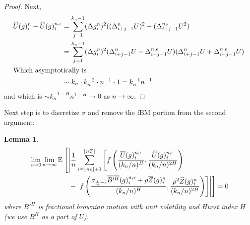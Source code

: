 \documentclass[12pt,letterpaper]{article}
\newtheorem{lemma}{Lemma}
\theoremstyle{definition}
\newcommand{\E}{\mathbb{E}}
\begin{document}
\begin{proof}
  Next,
  \begin{align}
    \widehat{U}(g)^{n}_i - \widehat{U}(g)^{n,\epsilon}_i &= \sum_{j=1}^{k_n-1}(\Delta g^n_i)^2((\Delta_{i+j-1}^{n}U)^2 - (\Delta_{i+j-1}^{n,\epsilon}U^2) \\
                                                         &= \sum_{j=1}^{k_n-1}(\Delta g^n_i)^2(\Delta_{i+j-1}^{n}U - \Delta_{i+j-1}^{n,\epsilon}U)(\Delta_{i+j-1}^{n}U + \Delta_{i+j-1}^{n,\epsilon}U) \\
    \intertext{Which asymptotically is}
                                                         &\sim k_n \cdot k_n^{-2} \cdot n^{-1} \cdot 1 = k_{n}^{-1}n^{-1}
  \end{align}
  and which is \(\sim k_{n}^{-1-H}n^{1-H} \rightarrow 0\) as \(n \rightarrow \infty\).
\end{proof}

Next step is to discretize \(\sigma\) and remove the fBM portion from the second argument:

\begin{lemma}
  \begin{align}
    \phantom{}
    \begin{aligned}
      &\lim_{\epsilon \rightarrow 0}\lim_{n \rightarrow \infty}\E \left[ \left| \frac{1}{n}\sum_{i=\left\lfloor n\epsilon \right\rfloor + 1}^{\left\lfloor nT \right\rfloor} \left[ f\left( \frac{\overline{U}(g)^{n,\epsilon}_i}{(k_n/n)^H}, \frac{\widehat{U}(g)^{n,\epsilon}_i}{(k_n/n)^{2H}} \right) \right. \right. \right. \\
      & \hspace*{2cm} - \left. \left. \left. f\left( \frac{\sigma_{\frac{i}{n}-\epsilon}\overline{B'^H}(g)^{n,\epsilon}_i + \rho\overline{Z}(g)^n_i}{(k_n/n)^{H}}, \frac{\rho^2\widehat{Z}(g)^n_i}{(k_n/n)^{2H}}\right) \right] \right| \right] = 0
    \end{aligned}
  \end{align}
  where \(B'^{H}\) is fractional brownian motion with unit volatility and Hurst index \(H\) (we use \(B^{H}\) as a part of \(U\)).
\end{lemma}
\end{document}
